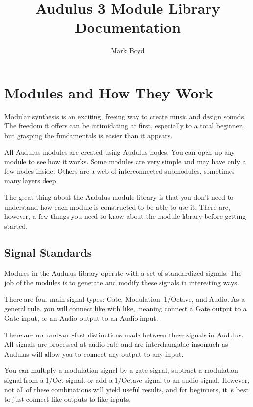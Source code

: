 \documentclass[11pt]{book}
\title{Audulus 3 Module Library Documentation}
\author{Mark Boyd}
\begin{document}
\maketitle

\tableofcontents

\chapter{Modules and How They Work}

\begin{multicols*}{2}

Modular synthesis is an exciting, freeing way to create music and design sounds. The freedom it offers can be intimidating at first, especially to a total beginner, but grasping the fundamentals is easier than it appears.

All Audulus modules are created using Audulus nodes. You can open up any module to see how it works. Some modules are very simple and may have only a few nodes inside. Others are a web of interconnected submodules, sometimes many layers deep.

The great thing about the Audulus module library is that you don't need to understand how each module is constructed to be able to use it. There are, however, a few things you need to know about the module library before getting started.

\section{Signal Standards}

Modules in the Audulus library operate with a set of standardized signals. The job of the modules is to generate and modify these signals in interesting ways.

There are four main signal types: Gate, Modulation, 1/Octave, and Audio. As a general rule, you will connect like with like, meaning connect a Gate output to a Gate input, or an Audio output to an Audio input.

There are no hard-and-fast distinctions made between these signals in Audulus. All signals are processed at audio rate and are interchangable insomuch as Audulus will allow you to connect any output to any input.

You can multiply a modulation signal by a gate signal, subtract a modulation signal from a 1/Oct signal, or add a 1/Octave signal to an audio signal. However, not all of these combinations will yield useful results, and for beginners, it is best to just connect like outputs to like inputs.


\end{multicols*}
\end{document}
